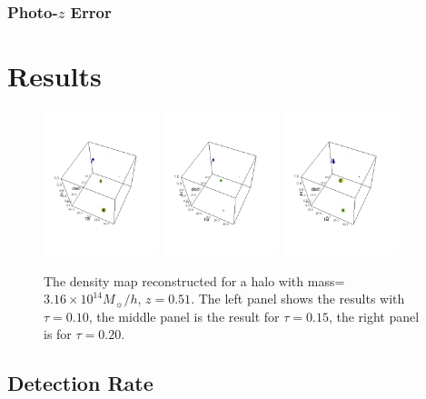 \documentclass[twocolumn]{aastex62}
\begin{document}
\subsubsection{Photo-$z$ Error}

\section{Results}
\label{sec:Res}

\begin{figure}
\centering
\includegraphics[width=0.3\textwidth]{resultExp-tau010.png}
\includegraphics[width=0.3\textwidth]{resultExp-tau015.png}
\includegraphics[width=0.3\textwidth]{resultExp-tau020.png}
\caption{The density map reconstructed for a halo with mass=$3.16\times 10^14 M_{\sun}/h$, $z=0.51$. The left panel shows
the results with $\tau=0.10$, the middle panel is the result for $\tau=0.15$, the right panel is for $\tau=0.20$.}
\end{figure}


\subsection{Detection Rate}
\end{document}
